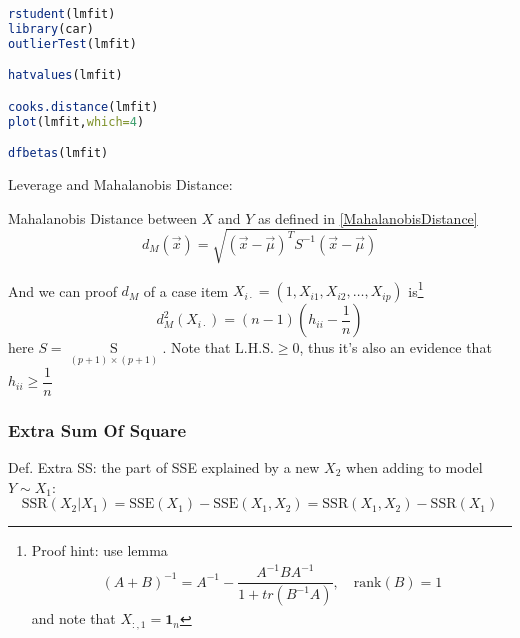     
 


\begin{rcode}
\begin{lstlisting}[language=R]
rstudent(lmfit)
library(car)
outlierTest(lmfit)

hatvalues(lmfit)

cooks.distance(lmfit)
plot(lmfit,which=4)

dfbetas(lmfit)
\end{lstlisting}
\end{rcode}

















Leverage and Mahalanobis Distance:
    
Mahalanobis Distance between $ X $ and $ Y $ as defined in \autoref{MahalanobisDistance}
\begin{equation}
     d_M(\vec{x})=\sqrt{(\vec{x}-\vec{\mu})^TS ^{-1}(\vec{x}-\vec{\mu})} 
\end{equation}

And we can proof $ d_M $ of a case item $ X_{ i\cdot}=(1,X_{i1},X_{i2},\ldots,X_{ip}) $ is\footnote{Proof hint: use lemma 
\begin{align*}
    (A+B)^{-1}=A^{-1}-\dfrac{A^{-1}BA^{-1}}{1+tr(B^{-1}A)},\quad \mathrm{rank}(B)=1 
\end{align*}
and note that $ X_{:,1}=\mathbf{1}_n $
}
\begin{equation}
    d_{M}^2(X_{i\cdot})=(n-1)(h_{ii}-\dfrac{1}{n}) 
\end{equation}
here $ S=\mathop{S}\limits_{(p+1)\times (p+1)}  $. Note that $  \mathrm{L.H.S.}\geq 0$, thus it's also an evidence that $ h_{ii}\geq \dfrac{1}{n} $

\subsubsection{Extra Sum Of Square}\label{SubSubSectionExtraSumOfSquare}
    Def. Extra SS: the part of SSE explained by a new $ X_2 $ when adding to model $ Y\sim X_1 $:
    \begin{equation}
        \mathrm{SSR}(X_2|X_1)=\mathrm{SSE}(X_1)-\mathrm{SSE}(X_1,X_2)=\mathrm{SSR}(X_1,X_2)-\mathrm{SSR}(X_1)  
    \end{equation}

